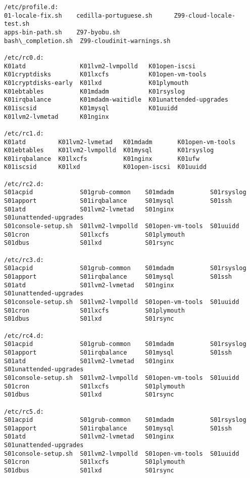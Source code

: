 \documentclass[11pt]{article}
\begin{document}
\begin{Verbatim}[commandchars=\\\{\}]
/etc/profile.d:
01-locale-fix.sh    cedilla-portuguese.sh      Z99-cloud-locale-test.sh
apps-bin-path.sh    Z97-byobu.sh
bash\_completion.sh  Z99-cloudinit-warnings.sh

/etc/rc0.d:
K01atd               K01lvm2-lvmpolld   K01open-iscsi
K01cryptdisks        K01lxcfs           K01open-vm-tools
K01cryptdisks-early  K01lxd             K01plymouth
K01ebtables          K01mdadm           K01rsyslog
K01irqbalance        K01mdadm-waitidle  K01unattended-upgrades
K01iscsid            K01mysql           K01uuidd
K01lvm2-lvmetad      K01nginx

/etc/rc1.d:
K01atd         K01lvm2-lvmetad   K01mdadm       K01open-vm-tools
K01ebtables    K01lvm2-lvmpolld  K01mysql       K01rsyslog
K01irqbalance  K01lxcfs          K01nginx       K01ufw
K01iscsid      K01lxd            K01open-iscsi  K01uuidd

/etc/rc2.d:
S01acpid             S01grub-common    S01mdadm          S01rsyslog
S01apport            S01irqbalance     S01mysql          S01ssh
S01atd               S01lvm2-lvmetad   S01nginx          S01unattended-upgrades
S01console-setup.sh  S01lvm2-lvmpolld  S01open-vm-tools  S01uuidd
S01cron              S01lxcfs          S01plymouth
S01dbus              S01lxd            S01rsync

/etc/rc3.d:
S01acpid             S01grub-common    S01mdadm          S01rsyslog
S01apport            S01irqbalance     S01mysql          S01ssh
S01atd               S01lvm2-lvmetad   S01nginx          S01unattended-upgrades
S01console-setup.sh  S01lvm2-lvmpolld  S01open-vm-tools  S01uuidd
S01cron              S01lxcfs          S01plymouth
S01dbus              S01lxd            S01rsync

/etc/rc4.d:
S01acpid             S01grub-common    S01mdadm          S01rsyslog
S01apport            S01irqbalance     S01mysql          S01ssh
S01atd               S01lvm2-lvmetad   S01nginx          S01unattended-upgrades
S01console-setup.sh  S01lvm2-lvmpolld  S01open-vm-tools  S01uuidd
S01cron              S01lxcfs          S01plymouth
S01dbus              S01lxd            S01rsync

/etc/rc5.d:
S01acpid             S01grub-common    S01mdadm          S01rsyslog
S01apport            S01irqbalance     S01mysql          S01ssh
S01atd               S01lvm2-lvmetad   S01nginx          S01unattended-upgrades
S01console-setup.sh  S01lvm2-lvmpolld  S01open-vm-tools  S01uuidd
S01cron              S01lxcfs          S01plymouth
S01dbus              S01lxd            S01rsync


\end{Verbatim}
\end{document}
